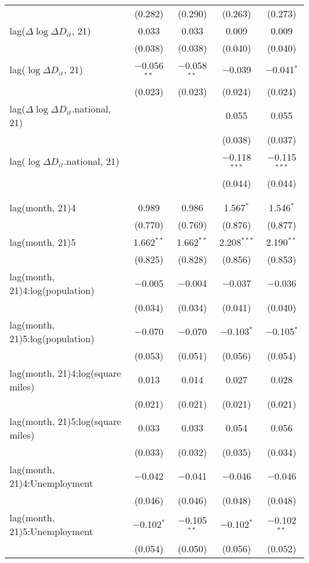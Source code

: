 \begin{tabular}{@{\extracolsep{1pt}}lcccc}
  & (0.282) & (0.290) & (0.263) & (0.273) \\ 
  lag($\Delta \log \Delta D_{it}$, 21) & 0.033 & 0.033 & 0.009 & 0.009 \\ 
  & (0.038) & (0.038) & (0.040) & (0.040) \\ 
  lag($\log \Delta D_{it}$, 21) & $-$0.056$^{**}$ & $-$0.058$^{**}$ & $-$0.039 & $-$0.041$^{*}$ \\ 
  & (0.023) & (0.023) & (0.024) & (0.024) \\ 
  lag($\Delta \log \Delta D_{it}$.national, 21) &  &  & 0.055 & 0.055 \\ 
  &  &  & (0.038) & (0.037) \\ 
  lag($\log \Delta D_{it}$.national, 21) &  &  & $-$0.118$^{***}$ & $-$0.115$^{***}$ \\ 
  &  &  & (0.044) & (0.044) \\ 
   &  &  &  &  \\ 
  &  &  &  &  \\ 
  lag(month, 21)4 & 0.989 & 0.986 & 1.567$^{*}$ & 1.546$^{*}$ \\ 
  & (0.770) & (0.769) & (0.876) & (0.877) \\ 
  lag(month, 21)5 & 1.662$^{**}$ & 1.662$^{**}$ & 2.208$^{***}$ & 2.190$^{**}$ \\ 
  & (0.825) & (0.828) & (0.856) & (0.853) \\ 
  lag(month, 21)4:log(population) & $-$0.005 & $-$0.004 & $-$0.037 & $-$0.036 \\ 
  & (0.034) & (0.034) & (0.041) & (0.040) \\ 
  lag(month, 21)5:log(population) & $-$0.070 & $-$0.070 & $-$0.103$^{*}$ & $-$0.105$^{*}$ \\ 
  & (0.053) & (0.051) & (0.056) & (0.054) \\ 
  lag(month, 21)4:log(square miles) & 0.013 & 0.014 & 0.027 & 0.028 \\ 
  & (0.021) & (0.021) & (0.021) & (0.021) \\ 
  lag(month, 21)5:log(square miles) & 0.033 & 0.033 & 0.054 & 0.056 \\ 
  & (0.033) & (0.032) & (0.035) & (0.034) \\ 
  lag(month, 21)4:Unemployment & $-$0.042 & $-$0.041 & $-$0.046 & $-$0.046 \\ 
  & (0.046) & (0.046) & (0.048) & (0.048) \\ 
  lag(month, 21)5:Unemployment & $-$0.102$^{*}$ & $-$0.105$^{**}$ & $-$0.102$^{*}$ & $-$0.102$^{**}$ \\ 
  & (0.054) & (0.050) & (0.056) & (0.052) \\ 

\end{tabular}
